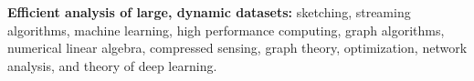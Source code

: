 \textbf{Efficient analysis of large, dynamic datasets:}
sketching,
streaming algorithms,
machine learning,
high performance computing,
graph algorithms,
numerical linear algebra,
compressed sensing,
graph theory,
optimization,
network analysis,
and theory of deep learning.
